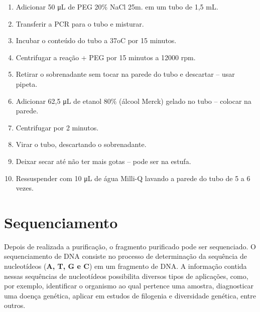\documentclass[
  letterpaper,
  DIV=11,
  numbers=noendperiod]{scrreprt}
\begin{document}
\begin{enumerate}
\def\labelenumi{\arabic{enumi}.}
\item
  Adicionar 50 μL de PEG 20\% NaCl 25m. em um tubo de 1,5 mL.
\item
  Transferir a PCR para o tubo e misturar.
\item
  Incubar o conteúdo do tubo a 37oC por 15 minutos.
\item
  Centrifugar a reação + PEG por 15 minutos a 12000 rpm.
\item
  Retirar o sobrenadante sem tocar na parede do tubo e descartar -- usar
  pipeta.
\item
  Adicionar 62,5 μL de etanol 80\% (álcool Merck) gelado no tubo --
  colocar na parede.
\item
  Centrifugar por 2 minutos.
\item
  Virar o tubo, descartando o sobrenadante.
\item
  Deixar secar até não ter mais gotas -- pode ser na estufa.
\item
  Ressuspender com 10 μL de água Milli-Q lavando a parede do tubo de 5 a
  6 vezes.
\end{enumerate}

\hypertarget{sequenciamento}{%
\chapter{Sequenciamento}\label{sequenciamento}}

Depois de realizada a purificação, o fragmento purificado pode ser
sequenciado. O sequenciamento de DNA consiste no processo de
determinação da sequência de nucleotídeos (\textbf{A, T, G e C}) em um
fragmento de DNA. A informação contida nessas sequências de nucleotídeos
possibilita diversos tipos de aplicações, como, por exemplo, identificar
o organismo ao qual pertence uma amostra, diagnosticar uma doença
genética, aplicar em estudos de filogenia e diversidade genética, entre
outros.
\end{document}
